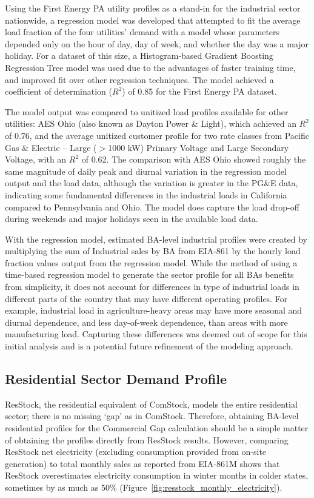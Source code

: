 Using the First Energy PA utility profiles as a stand-in for the industrial sector nationwide, a regression model was developed that attempted to fit the average load fraction of the four utilities’ demand with a model whose parameters depended only on the hour of day, day of week, and whether the day was a major holiday. For a dataset of this size, a Histogram-based Gradient Boosting Regression Tree model was used due to the advantages of faster training time, and improved fit over other regression techniques. The model achieved a coefficient of determination ($R^2$) of 0.85 for the First Energy PA dataset.

The model output was compared to unitized load profiles available for other utilities: AES Ohio (also known as Dayton Power \& Light), which achieved an $R^2$ of 0.76, and the average unitized customer profile for two rate classes from Pacific Gas \& Electric -- Large ($>$1000 kW) Primary Voltage and Large Secondary Voltage, with an $R^2$ of 0.62. The comparison with AES Ohio showed roughly the same magnitude of daily peak and diurnal variation in the regression model output and the load data, although the variation is greater in the PG\&E data, indicating some fundamental differences in the industrial loads in California compared to Pennsylvania and Ohio. The model does capture the load drop-off during weekends and major holidays seen in the available load data.

With the regression model, estimated BA-level industrial profiles were created by multiplying the sum of Industrial sales by BA from EIA-861 by the hourly load fraction values output from the regression model. 
While the method of using a time-based regression model to generate the sector profile for all BAs benefits from simplicity, it does not account for differences in type of industrial loads in different parts of the country that may have different operating profiles. For example, industrial load in agriculture-heavy areas may have more seasonal and diurnal dependence, and less day-of-week dependence, than areas with more manufacturing load. Capturing these differences was deemed out of scope for this initial analysis and is a potential future refinement of the modeling approach.

\subsection{Residential Sector Demand Profile}
ResStock,  the residential equivalent of ComStock, models the entire residential sector; there is no missing ‘gap’ as in ComStock. Therefore, obtaining BA-level residential profiles for the Commercial Gap calculation should be a simple matter of obtaining the profiles directly from ResStock results. However, comparing ResStock net electricity (excluding consumption provided from on-site generation) to total monthly sales as reported from EIA-861M shows that ResStock overestimates electricity consumption in winter months in colder states, sometimes by as much as 50\% (Figure~\ref{fig:resstock_monthly_electricity}).

